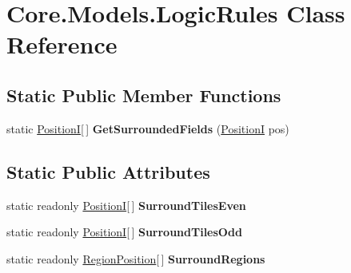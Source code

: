 \hypertarget{classCore_1_1Models_1_1LogicRules}{\section{Core.\-Models.\-Logic\-Rules Class Reference}
\label{classCore_1_1Models_1_1LogicRules}
}
\subsection*{Static Public Member Functions}
\begin{DoxyCompactItemize}
\item 
\hypertarget{classCore_1_1Models_1_1LogicRules_a27e2ffeb0da34f1119908281fc5a6510}{static \hyperlink{classCore_1_1Models_1_1PositionI}{Position\-I}\mbox{[}$\,$\mbox{]} {\bfseries Get\-Surrounded\-Fields} (\hyperlink{classCore_1_1Models_1_1PositionI}{Position\-I} pos)}\label{classCore_1_1Models_1_1LogicRules_a27e2ffeb0da34f1119908281fc5a6510}

\end{DoxyCompactItemize}
\subsection*{Static Public Attributes}
\begin{DoxyCompactItemize}
\item 
static readonly \hyperlink{classCore_1_1Models_1_1PositionI}{Position\-I}\mbox{[}$\,$\mbox{]} {\bfseries Surround\-Tiles\-Even}
\item 
static readonly \hyperlink{classCore_1_1Models_1_1PositionI}{Position\-I}\mbox{[}$\,$\mbox{]} {\bfseries Surround\-Tiles\-Odd}
\item 
static readonly \hyperlink{classCore_1_1Models_1_1RegionPosition}{Region\-Position}\mbox{[}$\,$\mbox{]} {\bfseries Surround\-Regions}
\end{DoxyCompactItemize}


